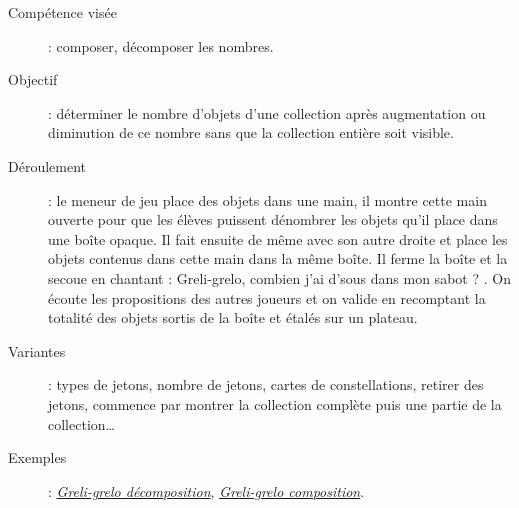\begin{exercice*} %
   \begin{description}
      \item[Compétence visée] : composer, décomposer les nombres.
      \item[Objectif] : déterminer le nombre d'objets d'une collection après augmentation ou diminution de ce nombre sans que la collection entière soit visible.
      \item[Déroulement] : le meneur de jeu place des objets dans une main, il montre cette main ouverte pour que les élèves puissent dénombrer les objets qu'il place dans une boîte opaque.
Il fait ensuite de même avec son autre droite et place les objets contenus dans cette main dans la même boîte. Il ferme la boîte et la secoue en chantant : \og Greli-grelo, combien j'ai d'sous dans mon sabot ? \fg. On écoute les propositions des autres joueurs et on valide en recomptant la totalité des objets sortis de la boîte et étalés sur un plateau. 
      \item[Variantes] : types de jetons, nombre de jetons, cartes de constellations, retirer des jetons, commence par montrer la collection complète puis une partie de la collection\dots
      \item[Exemples] : \href{https://www.youtube.com/watch?v=nM750kaM6zo}{\it\blue Greli-grelo décomposition}, \href{https://www.youtube.com/watch?v=qj_1ht_FXsg}{\it\blue Greli-grelo  composition}. \\
   \end{description}
\end{exercice*}

\bigskip


